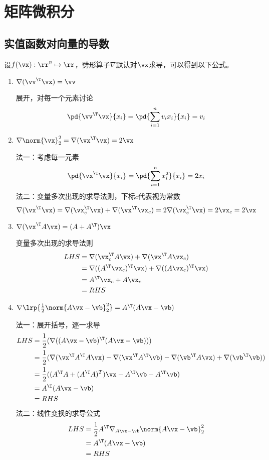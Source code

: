 
\newpage
\appendix
\section{矩阵微积分}
\subsection{实值函数对向量的导数}
设$f(\vx):\rr^n\mapsto\rr$，劈形算子$\nabla$默认对$\vx$求导，可以得到以下公式。
\begin{enumerate}
\item $\nabla (\vv^\T\vx)=\vv$
\begin{analysis}
    展开，对每一个元素讨论
    \[\pd{\vv^\T\vx}{x_i}=\pd{\sum_{i=1}^n v_i x_i}{x_i}=v_i\]
\end{analysis}
\item $\nabla\norm{\vx}_2^2=\nabla(\vx^\T\vx)=2\vx$
\begin{analysis}
    法一：考虑每一元素
    \[\pd{\vx^\T\vx}{x_i}=\pd{\sum_{i=1}^n x_i^2}{x_i}=2x_i\]
    法二：变量多次出现的求导法则，下标$c$代表视为常数
    \[\nabla(\vx^\T\vx)=\nabla(\vx_c^\T\vx)+\nabla(\vx^\T\vx_c)=2\nabla(\vx_c^\T\vx)=2\vx_c=2\vx\]
\end{analysis}
\item $\nabla(\vx^\T A\vx)=(A+A^\T)\vx$
\begin{analysis}
    变量多次出现的求导法则
    \[\begin{aligned}
        LHS&=\nabla(\vx_c^\T A\vx)+\nabla(\vx^\T A\vx_c)\\
        &=\nabla((A^\T\vx_c)^\T\vx)+\nabla((A\vx_c)^\T \vx)\\
        &=A^\T\vx_c+A\vx_c\\
        &=RHS
    \end{aligned}\]
\end{analysis}
\item $\nabla\lrp{\frac{1}{2}\norm{A\vx-\vb}_2^2}=A^\T(A\vx-\vb)$
\begin{analysis}
    法一：展开括号，逐一求导
    \[\begin{aligned}
        LHS&=\frac{1}{2}(\nabla((A\vx-\vb)^\T(A\vx-\vb)))\\
        &=\frac{1}{2}(\nabla(\vx^\T A^\T A\vx)-\nabla(\vx^\T A^\T\vb)-\nabla(\vb^\T A\vx)+\nabla(\vb^\T\vb))\\
        &=\frac{1}{2}((A^\T A+(A^\T A)^T)\vx-A^\T\vb-A^\T\vb)\\
        &=A^\T(A\vx-\vb)\\
        &=RHS
    \end{aligned}\]
    法二：线性变换的求导公式
    \[\begin{aligned}
        LHS&=\frac{1}{2}A^\T\nabla_{A\vx-\vb}\norm{A\vx-\vb}_2^2\\
        &=A^\T(A\vx-\vb)\\
        &=RHS
    \end{aligned}\]
\end{analysis}
\end{enumerate}

